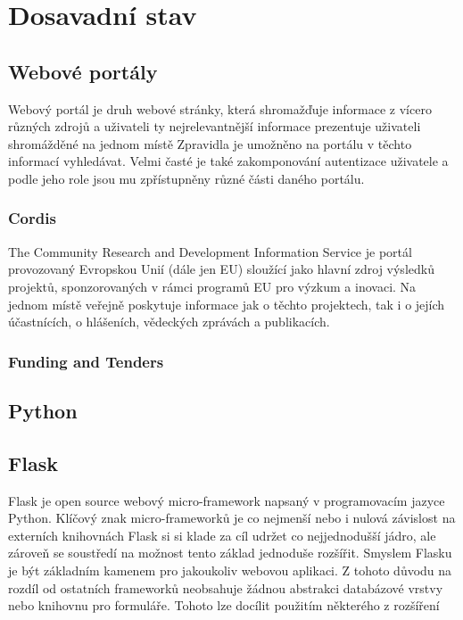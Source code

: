 \chapter{Dosavadní stav}

\section{Webové portály}
Webový portál je druh webové stránky, která shromažďuje informace z vícero různých zdrojů a uživateli ty nejrelevantnější informace prezentuje uživateli shromážděné na jednom místě %
Zpravidla je umožněno na portálu v těchto informací vyhledávat. Velmi časté je také zakomponování autentizace uživatele a podle jeho role jsou mu zpřístupněny různé části daného portálu. %
\blindtext[2]

\subsection{Cordis}
The Community Research and Development Information Service je portál provozovaný Evropskou Unií (dále jen EU) sloužící jako hlavní zdroj výsledků projektů, sponzorovaných v rámci programů EU pro výzkum a inovaci. Na jednom místě veřejně poskytuje informace jak o těchto projektech, tak i o jejích účastnících, o hlášeních, vědeckých zprávách a publikacích.
\blindtext

\subsection{Funding and Tenders}
\blindtext

\section{Python}
\blindtext[2]

\section{Flask}
Flask je open source webový micro-framework napsaný v programovacím jazyce Python. Klíčový znak micro-frameworků je co nejmenší nebo i nulová závislost na externích knihovnách %
Flask si si klade za cíl udržet co nejjednodušší jádro, ale zároveň se soustředí na možnost tento základ jednoduše rozšířit.
Smyslem Flasku je být základním kamenem pro jakoukoliv webovou aplikaci. Z tohoto důvodu na rozdíl od ostatních frameworků neobsahuje žádnou abstrakci databázové vrstvy nebo knihovnu pro formuláře. Tohoto lze docílit použitím některého z rozšíření %

